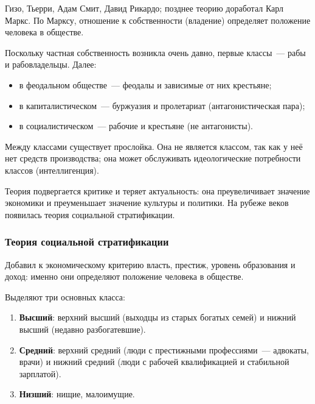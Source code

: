 \documentclass[12pt]{article}
\begin{document}
	\begin{person}
		Гизо, Тьерри, Адам Смит, Давид Рикардо; позднее теорию доработал Карл Маркс. По Марксу, отношение к собственности (владение) определяет положение человека в обществе.
	\end{person}

	Поскольку частная собственность возникла очень давно, первые классы~--- рабы и рабовладельцы. Далее:
	\begin{itemize}
		\item в феодальном обществе~--- феодалы и зависимые от них крестьяне;
		\item в капиталистическом~--- буржуазия и пролетариат (антагонистическая пара);
		\item в социалистическом~--- рабочие и крестьяне (не антагонисты).
	\end{itemize}

	\begin{note}[Прослойка]
		Между классами существует прослойка. Она не является классом, так как у неё нет средств производства; она может обслуживать идеологические потребности классов (интеллигенция).
	\end{note}

	\begin{note}
		Теория подвергается критике и теряет актуальность: она преувеличивает значение экономики и преуменьшает значение культуры и политики. На рубеже веков появилась теория социальной стратификации.
	\end{note}

	\subsubsection{Теория социальной стратификации}

	\begin{person}
		Добавил к экономическому критерию власть, престиж, уровень образования и доход: именно они определяют положение человека в обществе.
	\end{person}

	Выделяют три основных класса:
	\begin{enumerate}
		\item \textbf{Высший}: верхний высший (выходцы из старых богатых семей) и нижний высший (недавно разбогатевшие).
		\item \textbf{Средний}: верхний средний (люди с престижными профессиями~--- адвокаты, врачи) и нижний средний (люди с рабочей квалификацией и стабильной зарплатой).
		\item \textbf{Низший}: нищие, малоимущие.
	\end{enumerate}
\end{document}
